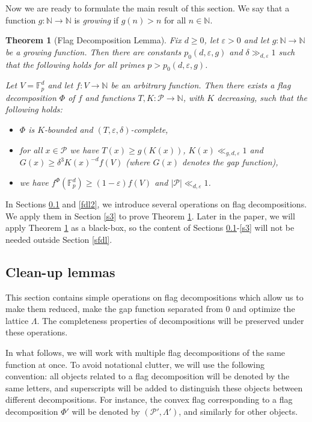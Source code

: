 \documentclass{daj}
\renewcommand{\ge}{\geqslant}
\newcommand{\N}{\mathbb N}
\newcommand{\FF}{\mathbb F}
\renewcommand{\P}{\mathcal P}
\newtheorem{theorem}{Theorem}[section]
\theoremstyle{definition}
\theoremstyle{remark}
\theoremstyle{definition}
\theoremstyle{definition}
\begin{document}
Now we are ready to formulate the main result of this section. We say that a function $g:\N\rightarrow \N$ is {\em growing} if $g(n) > n$ for all $n\in \N$.

\begin{theorem}[Flag Decomposition Lemma]\label{fdl}
Fix $d \ge 0$, let $\varepsilon > 0$ and let $g: \N \rightarrow \N$ be a growing function. Then there are constants $p_0(d, \varepsilon, g)$ and $\delta \gg_{d, \varepsilon} 1$ such that the following holds for all primes $p>p_0(d, \varepsilon, g)$.

Let $V = \FF_p^d$ and let $f: V \rightarrow \N$ be an arbitrary function. Then there exists a flag decomposition $\Phi$ of $f$ and functions $T, K: \P \rightarrow \N$, with $K$ decreasing, such that the following holds:
\begin{itemize}
    \item $\Phi$ is $K$-bounded and $(T, \varepsilon, \delta)$-complete,
    \item for all $x \in \P$ we have $T(x) \ge g(K(x))$, $K(x) \ll_{g, d, \varepsilon} 1$ and $G(x) \ge \delta^3 K(x)^{-d} f(V)$ (where $G(x)$ denotes the gap function),
    \item we have $f^{\Phi}(\FF_p^d) \ge (1-\varepsilon) f(V)$ and $|\P| \ll_{d, \varepsilon} 1$.
\end{itemize}
\end{theorem}

In Sections \ref{clp} and \ref{fdl2}, we introduce several operations on flag decompositions. We apply them in Section \ref{s3} to prove Theorem \ref{fdl}. Later in the paper, we will apply Theorem \ref{fdl} as a black-box, so the content of Sections \ref{clp}-\ref{s3} will not be needed outside Section \ref{sfdl}.

\subsection{Clean-up lemmas}\label{clp}

This section contains simple operations on flag decompositions which allow us to make them reduced, make the gap function separated from 0 and optimize the lattice $\Lambda$. The completeness properties of decompositions will be preserved under these operations. 

In what follows, we will work with multiple flag decompositions of the same function at once. To avoid notational clutter, we will use the following convention: all objects related to a flag decomposition will be denoted by the same letters, and superscripts will be added to distinguish these objects between different decompositions. For instance, the convex flag corresponding to a flag decomposition $\Phi'$ will be denoted by $(\P',\Lambda')$, and similarly for other objects.
\end{document}
